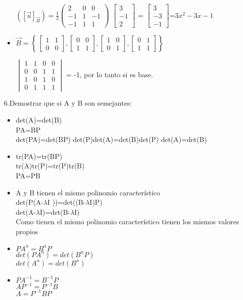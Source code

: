 \begin{itemize}
$(\left [ \vec{u} \right ]_{\vec{B}})=\frac{1}{2}\begin{pmatrix}
2& 0 & 0\\ 
-1& 1 & -1\\ 
-1& 1 & 1
\end{pmatrix}$ $\begin{bmatrix}
3\\ 
-1\\ 
2
\end{bmatrix}$ = $\begin{bmatrix}
3\\ 
-3\\ 
-1
\end{bmatrix}$=$3x^{2}-3x-1$
\item $\vec{B}= \left\lbrace\ \begin{bmatrix}
 1& 1\\ 
 0& 0
\end{bmatrix},\begin{bmatrix}
 0& 0\\ 
 1& 1
\end{bmatrix},\begin{bmatrix}
 1& 0\\ 
 0& 1
\end{bmatrix},\begin{bmatrix}
 0& 1\\ 
 1& 1
\end{bmatrix}\right\rbrace\ $

$\begin{vmatrix}
 1& 1 & 0&0\\ 
 0& 0 & 1&1\\ 
 1& 0 & 1&0\\
 0& 1 & 1&1
\end{vmatrix}$ = -1, por lo tanto si es base. 
\end{itemize}

6.Demostrar que si A y B son semejantes:\\

\begin{itemize}
\item det(A)=det(B)\\
PA=BP\\
det(PA)=det(BP)
det(P)det(A)=det(B)det(P)
det(A)=det(B)
\item tr(PA)=tr(BP)\\
tr(A)tr(P)=tr(P)tr(B)\\
PA=PB
\item A y B tienen el mismo polinomio característico\\
det(P(A-$\lambda$I ))=det((B-$\lambda$I)P)\\
det(A-$\lambda$I)=det(B-$\lambda$I)\\
Como tienen el mismo polinomio característico tienen los mismos valores propios 
\item $PA^{n}=B^{n}P$\\
$det(PA^{n})=det(B^{n}P)$\\
$det(A^{n})=det(B^{n})$
\item $PA^{-1}=B^{-1}P$\\
$AP^{-1}=P^{-1}B$\\
$A=P^{-1}BP$
\end{itemize}
